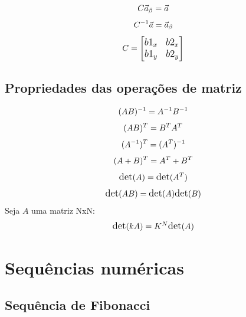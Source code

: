 \begin{equation*}
\large C \vec{a}_\beta = \vec{a}
\end{equation*} 
\begin{equation*}
\large C^{-1} \vec{a} = \vec{a}_\beta
\end{equation*} 
\begin{equation*} 
\large
C = 
\begin{bmatrix}
    b1_x & b2_x \\
    b1_y & b2_y
\end{bmatrix}
\end{equation*}


\subsection{Propriedades das operações de matriz}

\begin{equation*} 
\large (AB)^{-1} = A^{-1}B^{-1}\\
\end{equation*}
\begin{equation*} 
\large (AB)^{T} = B^{T}A^{T} \\
\end{equation*}
\begin{equation*} 
\large (A^{-1})^{T} = (A^{T})^{-1} \\
\end{equation*}
\begin{equation*} 
\large (A+B)^{T} = A^{T} + B^{T} \\
\end{equation*}
\begin{equation*} 
\large \text{det}(A) = \text{det}(A^{T}) \\
\end{equation*}
\begin{equation*} 
\large \text{det}(AB) = \text{det}(A)\text{det}(B) \\
\end{equation*}
{\large Seja $A$ uma matriz NxN:}
\begin{equation*} 
\large \text{det}(kA) = K^N\text{det}(A) \\
\end{equation*}

\section{Sequências numéricas}

\subsection{Sequência de Fibonacci}

